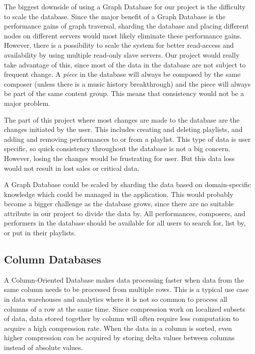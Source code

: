 The biggest downside of using a Graph Database for our project is the difficulty to scale the database. Since the major benefit of a Graph Database is the performance gains of graph traversal, sharding the database and placing different nodes on different servers would most likely eliminate these performance gains. However, there is a possibility to scale the system for better read-access and availability by using multiple read-only slave servers. Our project would really take advantage of this, since most of the data in the database are not subject to frequent change. A \emph{piece} in the database will always be composed by the same composer (unless there is a music history breakthrough) and the piece will always be part of the same content group. This means that consistency would not be a major problem.

The part of this project where most changes are made to the database are the changes initiated by the user. This includes creating and deleting playlists, and adding and removing performances to or from a playlist. This type of data is user specific, so quick consistency throughout the database is not a big concern. However, losing the changes would be frustrating for user. But this data loss would not result in lost sales or critical data.

A Graph Database could be scaled by sharding the data based on domain-specific knowledge which could be managed in the application. This would probably become a bigger challenge as the database grows, since there are no suitable attribute in our project to divide the data by. All performances, composers, and performers in the database should be available for all users to search for, list by, or put in their playlists.

\subsection{Column Databases}
\label{analysis-col-db}

A Column-Oriented Database makes data processing faster when data from the same column needs to be processed from multiple rows. This is a typical use case in data warehouses and analytics where it is not so common to process all columns of a row at the same time.
Since compression work on localized subsets of data, data stored together by column will often require less computation to acquire a high compression rate. When the data in a column is sorted, even higher compression can be acquired by storing delta values between columns instead of absolute values.

